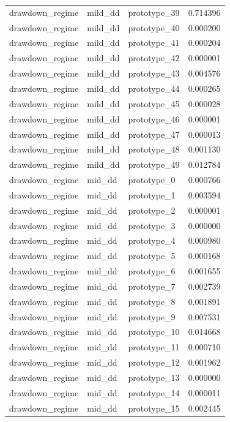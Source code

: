 \begin{tabular}{lllr}
drawdown\_regime & mild\_dd & prototype\_39 & 0.714396 \\
drawdown\_regime & mild\_dd & prototype\_40 & 0.000200 \\
drawdown\_regime & mild\_dd & prototype\_41 & 0.000204 \\
drawdown\_regime & mild\_dd & prototype\_42 & 0.000001 \\
drawdown\_regime & mild\_dd & prototype\_43 & 0.004576 \\
drawdown\_regime & mild\_dd & prototype\_44 & 0.000265 \\
drawdown\_regime & mild\_dd & prototype\_45 & 0.000028 \\
drawdown\_regime & mild\_dd & prototype\_46 & 0.000001 \\
drawdown\_regime & mild\_dd & prototype\_47 & 0.000013 \\
drawdown\_regime & mild\_dd & prototype\_48 & 0.001130 \\
drawdown\_regime & mild\_dd & prototype\_49 & 0.012784 \\
drawdown\_regime & mid\_dd & prototype\_0 & 0.000766 \\
drawdown\_regime & mid\_dd & prototype\_1 & 0.003594 \\
drawdown\_regime & mid\_dd & prototype\_2 & 0.000001 \\
drawdown\_regime & mid\_dd & prototype\_3 & 0.000000 \\
drawdown\_regime & mid\_dd & prototype\_4 & 0.000980 \\
drawdown\_regime & mid\_dd & prototype\_5 & 0.000168 \\
drawdown\_regime & mid\_dd & prototype\_6 & 0.001655 \\
drawdown\_regime & mid\_dd & prototype\_7 & 0.002739 \\
drawdown\_regime & mid\_dd & prototype\_8 & 0.001891 \\
drawdown\_regime & mid\_dd & prototype\_9 & 0.007531 \\
drawdown\_regime & mid\_dd & prototype\_10 & 0.014668 \\
drawdown\_regime & mid\_dd & prototype\_11 & 0.000710 \\
drawdown\_regime & mid\_dd & prototype\_12 & 0.001962 \\
drawdown\_regime & mid\_dd & prototype\_13 & 0.000000 \\
drawdown\_regime & mid\_dd & prototype\_14 & 0.000011 \\
drawdown\_regime & mid\_dd & prototype\_15 & 0.002445 \\

\end{tabular}
